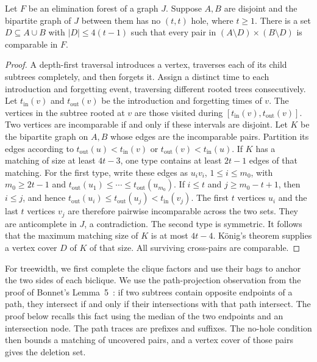 \begin{lemma}\label{lem:sparse-biclique-completion}
Let $F$ be an elimination forest of a graph $J$. Suppose $A,B$ are
disjoint and the bipartite graph of $J$ between them has no $(t,t)$
hole, where $t\ge1$. There is a set $D\subseteq A\cup B$ with
$|D|\le4(t-1)$ such that every pair in
$(A\setminus D)\times(B\setminus D)$ is comparable in $F$.
\end{lemma}

\begin{proof}
A depth-first traversal introduces a vertex, traverses each of its
child subtrees completely, and then forgets it. Assign a distinct
time to each introduction and forgetting event, traversing different
rooted trees consecutively. Let $t_{\mathrm{in}}(v)$ and $t_{\mathrm{out}}(v)$ be the
introduction and forgetting times of $v$. The vertices in the
subtree rooted at $v$ are those visited during
$[t_{\mathrm{in}}(v),t_{\mathrm{out}}(v)]$.
Two vertices are incomparable if and only if these intervals
are disjoint. Let $K$ be the bipartite graph on $A,B$ whose edges
are the incomparable pairs. Partition its edges according to
$t_{\mathrm{out}}(u)<t_{\mathrm{in}}(v)$ or $t_{\mathrm{out}}(v)<t_{\mathrm{in}}(u)$.
If $K$ has a matching of size at least $4t-3$, one type contains
at least $2t-1$ edges of that matching. For the first type, write
these edges as $u_iv_i$, $1\le i\le m_0$, with $m_0\ge2t-1$ and
$t_{\mathrm{out}}(u_1)\le\cdots\le t_{\mathrm{out}}(u_{m_0})$. If $i\le t$ and $j\ge m_0-t+1$,
then $i\le j$, and hence $t_{\mathrm{out}}(u_i)\le t_{\mathrm{out}}(u_j)<t_{\mathrm{in}}(v_j)$.
The first $t$ vertices $u_i$ and the last $t$ vertices $v_j$ are
therefore pairwise incomparable across the two sets. They are
anticomplete in $J$, a contradiction. The second type is symmetric.
It follows that the maximum matching size of $K$ is at most $4t-4$.
K\"onig's theorem supplies a vertex cover $D$ of $K$ of that size.
All surviving cross-pairs are comparable.
\end{proof}

For treewidth, we first complete the clique factors and use their
bags to anchor the two sides of each biclique. We use the
path-projection observation from the proof of Bonnet's
Lemma~5~\cite{BonnetTreewidth}: if two subtrees contain opposite
endpoints of a path, they intersect if and only if their
intersections with that path intersect. The proof below recalls this
fact using the median of the two endpoints and an intersection node.
The path traces are prefixes and suffixes. The no-hole condition
then bounds a matching of uncovered pairs, and a vertex cover of
those pairs gives the deletion set.

